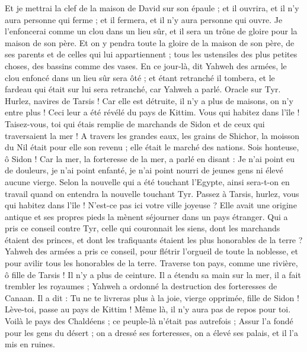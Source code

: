 \begin{multicols}{2}
Et je mettrai la clef de la maison de David sur son épaule ; et il ouvrira, et il n'y aura personne qui ferme ; et il fermera, et il n'y aura personne qui ouvre.
Je l'enfoncerai comme un clou dans un lieu sûr, et il sera un trône de gloire pour la maison de son père.
Et on y pendra toute la gloire de la maison de son père, de ses parents et de celles qui lui appartiennent ; tous les ustensiles des plus petites choses,  des bassins comme des vases. 
En ce jour-là, dit Yahweh des armées, le clou enfoncé dans un lieu sûr sera ôté ; et étant retranché il tombera, et le fardeau qui était sur lui sera retranché, car Yahweh a parlé.
\VerseOne{}Oracle sur Tyr. Hurlez, navires de Tarsis ! Car elle est détruite, il n'y a plus de maisons, on n'y entre plus ! Ceci leur a été révélé du pays de Kittim.
Vous qui habitez dans l'île ! Taisez-vous, toi qui étais remplie de marchands de Sidon et de ceux qui traversaient la mer !
A travers les grandes eaux, les grains de Shichor, la moisson du Nil était pour elle son revenu ; elle était le marché des nations.
Sois honteuse, ô Sidon ! Car la mer, la forteresse de la mer, a parlé en disant : Je n'ai point eu de douleurs, je n'ai point enfanté, je n'ai point nourri de jeunes gens ni élevé aucune vierge.
Selon la nouvelle qui a été touchant l'Egypte, ainsi sera-t-on en travail quand on entendra la nouvelle touchant Tyr.
Passez à Tarsis, hurlez, vous qui habitez dans l'île !
N'est-ce pas ici votre ville joyeuse ? Elle avait une origine antique et ses propres pieds la mènent séjourner dans un pays étranger.
Qui a pris ce conseil contre Tyr, celle qui couronnait les siens, dont les marchands étaient des princes, et dont les trafiquants étaient les plus honorables de la terre ?
Yahweh des armées a pris ce conseil, pour flétrir l'orgueil de toute la noblesse, et pour avilir tous les honorables de la terre.
Traverse ton pays, comme une rivière, ô fille de Tarsis ! Il n'y a plus de ceinture.
Il a étendu sa main sur la mer, il a fait trembler les royaumes ; Yahweh a ordonné la destruction des forteresses de Canaan.
Il a dit : Tu ne te livreras plus à la joie, vierge opprimée, fille de Sidon ! Lève-toi, passe au pays de Kittim ! Même là, il n'y aura pas de repos pour toi.
Voilà le pays des Chaldéens ; ce peuple-là n'était pas autrefois ; Assur l'a fondé pour les gens du désert ; on a dressé ses forteresses, on a élevé ses palais, et il l'a mis en ruines.

\end{multicols}
